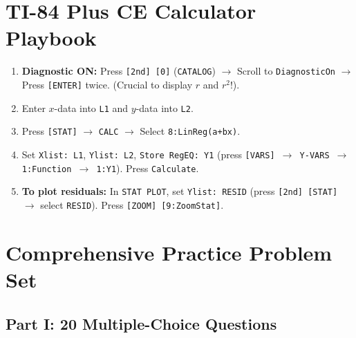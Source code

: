 \section{TI-84 Plus CE Calculator Playbook}

\begin{calculatorbox}
\begin{enumerate}[leftmargin=1.2em]
  \item \textbf{Diagnostic ON:} Press \texttt{[2nd] [0]} (\texttt{CATALOG}) $\rightarrow$ Scroll to \texttt{DiagnosticOn} $\rightarrow$ Press \texttt{[ENTER]} twice. (Crucial to display $r$ and $r^2$!).
  \item Enter $x$-data into \texttt{L1} and $y$-data into \texttt{L2}.
  \item Press \texttt{[STAT]} $\rightarrow$ \texttt{CALC} $\rightarrow$ Select \texttt{8:LinReg(a+bx)}.
  \item Set \texttt{Xlist: L1}, \texttt{Ylist: L2}, \texttt{Store RegEQ: Y1} (press \texttt{[VARS] $\rightarrow$ Y-VARS $\rightarrow$ 1:Function $\rightarrow$ 1:Y1}). Press \texttt{Calculate}.
  \item \textbf{To plot residuals:} In \texttt{STAT PLOT}, set \texttt{Ylist: RESID} (press \texttt{[2nd] [STAT]} $\rightarrow$ select \texttt{RESID}). Press \texttt{[ZOOM] [9:ZoomStat]}.
\end{enumerate}
\end{calculatorbox}

\section{Comprehensive Practice Problem Set}

\subsection*{Part I: 20 Multiple-Choice Questions}

